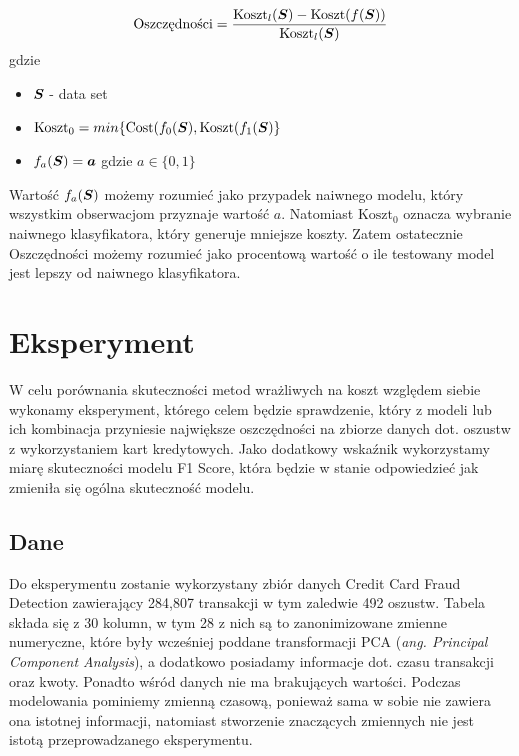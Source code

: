\documentclass[inzynierska]{pwr_wmat_praca_dyplomowa}
\theoremstyle{plain}
\numberwithin{theorem}{chapter}
\theoremstyle{definition}
\numberwithin{theorem}{chapter}
\begin{document}
\begin{equation}
	\text{Oszczędności} = \frac{\text{Koszt}_{l}(\boldsymbol{S}) - \text{Koszt}(f(\boldsymbol{S}))}{\text{Koszt}_{l}(\boldsymbol{S})}
\end{equation}
gdzie
\begin{itemize}
	\item $ \boldsymbol{S} $ - data set
	\item $ \text{Koszt}_0 = min\{\text{Cost}(f_{0}(\boldsymbol{S}), \text{Koszt}(f_{1}(\boldsymbol{S})\} $
	\item $ f_{a}(\boldsymbol{S}) = \boldsymbol{a} $ gdzie $a \in \{0,1\}$
\end{itemize}{}
Wartość $ f_{a}(\boldsymbol{S})$ możemy rozumieć jako przypadek naiwnego modelu, który wszystkim obserwacjom przyznaje wartość $a$. Natomiast $ \text{Koszt}_0 $ oznacza wybranie naiwnego klasyfikatora, który generuje mniejsze koszty. Zatem ostatecznie Oszczędności możemy rozumieć jako procentową wartość o ile testowany model jest lepszy od naiwnego klasyfikatora.


\chapter{Eksperyment}
W celu porównania skuteczności metod wrażliwych na koszt względem siebie wykonamy eksperyment, którego celem będzie sprawdzenie, który z modeli lub ich kombinacja przyniesie największe oszczędności na zbiorze danych dot. oszustw z wykorzystaniem kart kredytowych. Jako dodatkowy wskaźnik wykorzystamy miarę skuteczności modelu F1 Score, która będzie w stanie odpowiedzieć jak zmieniła się ogólna skuteczność modelu.

\section{Dane}
Do eksperymentu zostanie wykorzystany zbiór danych Credit Card Fraud Detection zawierający 284,807 transakcji w tym zaledwie 492 oszustw. Tabela składa się z 30 kolumn, w tym 28 z nich są to zanonimizowane zmienne numeryczne, które były wcześniej poddane transformacji PCA (\textit{ang. Principal Component Analysis}), a dodatkowo posiadamy informacje dot. czasu transakcji oraz kwoty. Ponadto wśród danych nie ma brakujących wartości. Podczas modelowania pominiemy zmienną czasową, ponieważ sama w sobie nie zawiera ona istotnej informacji, natomiast stworzenie znaczących zmiennych nie jest istotą przeprowadzanego eksperymentu. 
\end{document}
